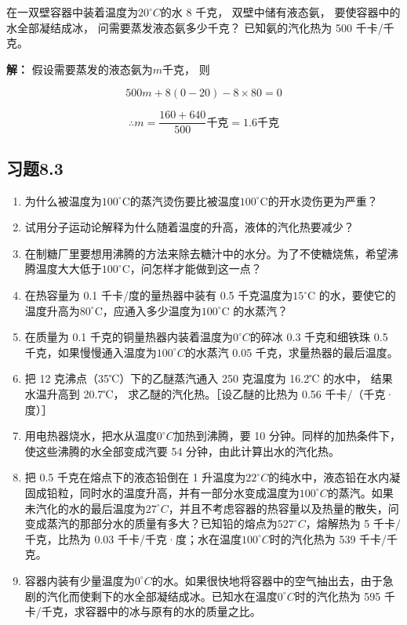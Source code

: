 在一双壁容器中装着温度为\(20^{\circ}C\)的水 8 千克， 双壁中储有液态氨，
要使容器中的水全部凝结成冰， 问需要蒸发液态氨多少千克？ 已知氨的汽化热为
500 千卡/千克。

\textbf{解：} 假设需要蒸发的液态氨为\(m\)千克， 则

\[
500 m + 8 (0 - 20) - 8 \times 80 = 0
\]

\[
\therefore m = \frac {160 + 640}{500} \text{千克} = 1.6 \text{千克}
\]

\subsection{习题8.3}\label{ux4e60ux98988.3}

\begin{enumerate}
\def\labelenumi{\arabic{enumi}.}
\item
  为什么被温度为\(100^{\circ} \mathrm{C}\)的蒸汽烫伤要比被温度\(100^{\circ} \mathrm{C}\)的开水烫伤更为严重？
\item
  试用分子运动论解释为什么随着温度的升高，液体的汽化热要减少？
\item
  在制糖厂里要想用沸腾的方法来除去糖汁中的水分。为了不使糖烧焦，希望沸腾温度大大低于\(100^{\circ}\mathrm{C}\)，问怎样才能做到这一点？
\item
  在热容量为 0.1 千卡/度的量热器中装有 0.5 千克温度为\(15^{\circ}\)C
  的水，要使它的温度升高为\(80^{\circ}\)C，应通入多少温度为\(100^{\circ}\)C
  的水蒸汽？
\item
  在质量为 0.1 千克的铜量热器内装着温度为\(0^{\circ}C\)的碎冰 0.3
  千克和细铁珠 0.5 千克，如果慢慢通入温度为\(100^{\circ}C\)的水蒸汽 0.05
  千克，求量热器的最后温度。
\item
  把 12 克沸点（35℃）下的乙醚蒸汽通入 250 克温度为 16.2℃ 的水中，
  结果水温升高到 20.7℃， 求乙醚的汽化热。［设乙醚的比热为 0.56
  千卡/（千克·度）］
\item
  用电热器烧水，把水从温度\(0^{\circ}C\)加热到沸腾，要 10
  分钟。同样的加热条件下，使这些沸腾的水全部变成汽要 54
  分钟，由此计算出水的汽化热。
\item
  把 0.5 千克在熔点下的液态铅倒在 1
  升温度为\(22^{\circ}C\)的纯水中，液态铅在水内凝固成铅粒，同时水的温度升高，并有一部分水变成温度为\(100^{\circ}C\)的蒸汽。如果未汽化的水的最后温度为\(27^{\circ}C\)，并且不考虑容器的热容量以及热量的散失，问变成蒸汽的那部分水的质量有多大？已知铅的熔点为\(527^{\circ}C\)，熔解热为
  5 千卡/千克，比热为 0.03
  千卡/千克·度；水在温度\(100^{\circ}C\)时的汽化热为 539 千卡/千克。
\item
  容器内装有少量温度为\(0^{\circ}C\)的水。如果很快地将容器中的空气抽出去，由于急剧的汽化而使剩下的水全部凝结成冰。已知水在温度\(0^{\circ}C\)时的汽化热为
  595 千卡/千克，求容器中的冰与原有的水的质量之比。
\end{enumerate}

